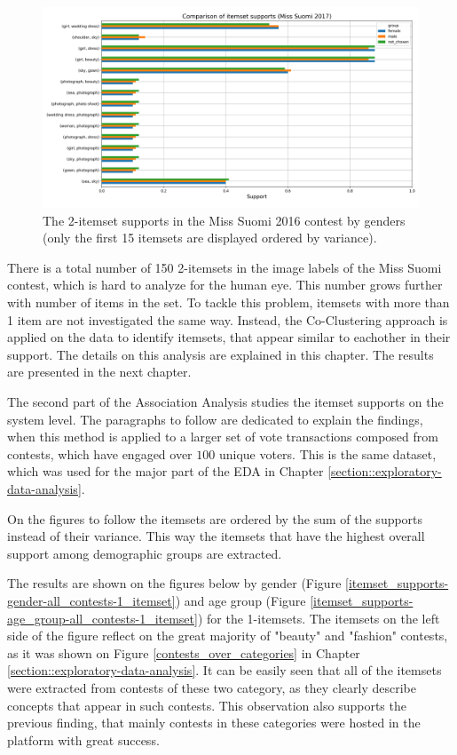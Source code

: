 \begin{figure}[h] 
    \begin{center}
        \includegraphics[width=1.0\textwidth]{Images/itemset_supports-gender-Miss_Helsinki-2_itemset.png}
        \caption{The 2-itemset supports in the Miss Suomi 2016 contest by genders (only the first 15 itemsets are displayed ordered by variance).}
        \label{itemset_supports-gender-Miss_Helsinki-2_itemset}
    \end{center}
\end{figure}

There is a total number of 150 2-itemsets in the image labels of the Miss Suomi contest, which is hard to analyze for the human eye. This number grows further with number of items in the set. To tackle this problem, itemsets with more than 1 item are not investigated the same way. Instead, the Co-Clustering approach is applied on the data to identify itemsets, that appear similar to eachother in their support. The details on this analysis are explained in this chapter. The results are presented in the next chapter.

The second part of the Association Analysis studies the itemset supports on the system level. The paragraphs to follow are dedicated to explain the findings, when this method is applied to a larger set of vote transactions composed from contests, which have engaged over $100$ unique voters. This is the same dataset, which was used for the major part of the EDA in Chapter \ref{section::exploratory-data-analysis}.

On the figures to follow the itemsets are ordered by the sum of the supports instead of their variance. This way the itemsets that have the highest overall support among demographic groups are extracted.

The results are shown on the figures below by gender (Figure \ref{itemset_supports-gender-all_contests-1_itemset}) and age group (Figure \ref{itemset_supports-age_group-all_contests-1_itemset}) for the 1-itemsets. The itemsets on the left side of the figure reflect on the great majority of "beauty" and "fashion" contests, as it was shown on Figure \ref{contests_over_categories} in Chapter \ref{section::exploratory-data-analysis}. It can be easily seen that all of the itemsets were extracted from contests of these two category, as they clearly describe concepts that appear in such contests. This observation also supports the previous finding, that mainly contests in these categories were hosted in the platform with great success.

